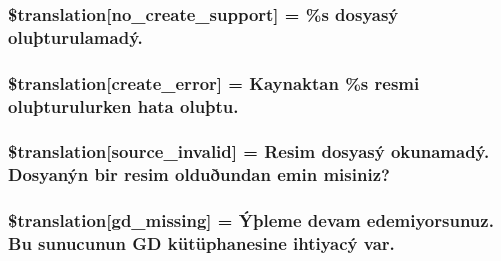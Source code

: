 \subsubsection[{\$translation}]{\setlength{\rightskip}{0pt plus 5cm}\$translation\mbox{[}\textquotesingle{}no\+\_\+create\+\_\+support\textquotesingle{}\mbox{]} = \textquotesingle{}\%s dosyasý oluþturulamadý.\textquotesingle{}}\label{class_8upload_8tr___t_r_8php_a346dfd1ade29f583dd20d345c436859f}
\hypertarget{class_8upload_8tr___t_r_8php_a53013ce9255c4e1849098ddd9fdb2b3f}{}
\subsubsection[{\$translation}]{\setlength{\rightskip}{0pt plus 5cm}\$translation\mbox{[}\textquotesingle{}create\+\_\+error\textquotesingle{}\mbox{]} = \textquotesingle{}Kaynaktan \%s resmi oluþturulurken hata oluþtu.\textquotesingle{}}\label{class_8upload_8tr___t_r_8php_a53013ce9255c4e1849098ddd9fdb2b3f}
\hypertarget{class_8upload_8tr___t_r_8php_a6ab0a660b457eaf2d3434b225449fdd6}{}
\subsubsection[{\$translation}]{\setlength{\rightskip}{0pt plus 5cm}\$translation\mbox{[}\textquotesingle{}source\+\_\+invalid\textquotesingle{}\mbox{]} = \textquotesingle{}Resim dosyasý okunamadý. Dosyanýn bir resim olduðundan emin misiniz?\textquotesingle{}}\label{class_8upload_8tr___t_r_8php_a6ab0a660b457eaf2d3434b225449fdd6}
\hypertarget{class_8upload_8tr___t_r_8php_a7f3dfcc0db4bbc0f2e7210c439798e56}{}
\subsubsection[{\$translation}]{\setlength{\rightskip}{0pt plus 5cm}\$translation\mbox{[}\textquotesingle{}gd\+\_\+missing\textquotesingle{}\mbox{]} = \textquotesingle{}Ýþleme devam edemiyorsunuz. Bu sunucunun G\+D kütüphanesine ihtiyacý var.\textquotesingle{}}\label{class_8upload_8tr___t_r_8php_a7f3dfcc0db4bbc0f2e7210c439798e56}
\hypertarget{class_8upload_8tr___t_r_8php_a82d5853430ab72dc1f9799ec36144cc6}{}
